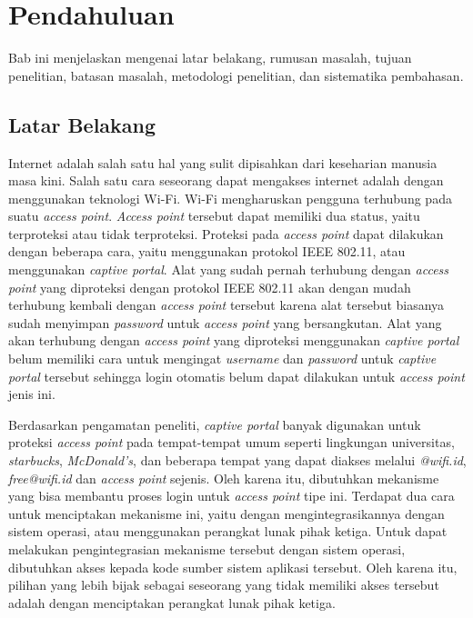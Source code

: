 \chapter{Pendahuluan}
\label{chap:pendahuluan}

Bab ini menjelaskan mengenai latar belakang, rumusan masalah, tujuan penelitian, batasan masalah, metodologi penelitian, dan sistematika pembahasan.



\section{Latar Belakang}
\label{sec:latar_belakang}

Internet adalah salah satu hal yang sulit dipisahkan dari keseharian manusia masa kini. Salah satu cara seseorang dapat mengakses internet adalah dengan menggunakan teknologi Wi-Fi. Wi-Fi mengharuskan pengguna terhubung pada suatu \textit{access point}. \textit{Access point} tersebut dapat memiliki dua status, yaitu terproteksi atau tidak terproteksi. Proteksi pada \textit{access point} dapat dilakukan dengan beberapa cara, yaitu menggunakan protokol IEEE 802.11, atau menggunakan \textit{captive portal}. Alat yang sudah pernah terhubung dengan \textit{access point} yang diproteksi dengan protokol IEEE 802.11 akan dengan mudah terhubung kembali dengan \textit{access point} tersebut karena alat tersebut biasanya sudah menyimpan \textit{password} untuk \textit{access point} yang bersangkutan. Alat yang akan terhubung dengan \textit{access point} yang diproteksi menggunakan \textit{captive portal} belum memiliki cara untuk mengingat \textit{username} dan \textit{password} untuk \textit{captive portal} tersebut sehingga login otomatis belum dapat dilakukan untuk \textit{access point} jenis ini.

Berdasarkan pengamatan peneliti, \textit{captive portal} banyak digunakan untuk proteksi \textit{access point} pada tempat-tempat umum seperti lingkungan universitas, \textit{starbucks}, \textit{McDonald's}, dan beberapa tempat yang dapat diakses melalui \textit{@wifi.id}, \textit{free@wifi.id} dan \textit{access point} sejenis. Oleh karena itu, dibutuhkan mekanisme yang bisa membantu proses login untuk \textit{access point} tipe ini. Terdapat dua cara untuk menciptakan mekanisme ini, yaitu dengan mengintegrasikannya dengan sistem operasi, atau menggunakan perangkat lunak pihak ketiga. Untuk dapat melakukan pengintegrasian mekanisme tersebut dengan sistem operasi, dibutuhkan akses kepada kode sumber sistem aplikasi tersebut. Oleh karena itu, pilihan yang lebih bijak sebagai seseorang yang tidak memiliki akses tersebut adalah dengan menciptakan perangkat lunak pihak ketiga.



